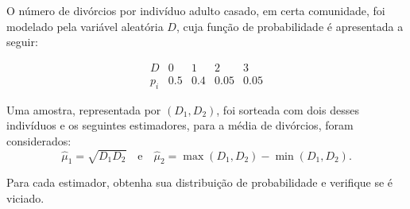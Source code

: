 %
%


\begin{exercicioBanco}[\valorquestao]
    O número de divórcios por indivíduo adulto casado, em certa comunidade, foi modelado pela variável aleatória \(D\), cuja função de probabilidade é apresentada a seguir:

\[
\begin{array}{c|cccc}
D   & 0 & 1 & 2 & 3 \\ \hline
p_i & 0.5 & 0.4 & 0.05 & 0.05
\end{array}
\]

Uma amostra, representada por \((D_1, D_2)\), foi sorteada com dois desses indivíduos e os seguintes estimadores, para a média de divórcios, foram considerados:
\[
\hat{\mu}_1 = \sqrt{D_1D_2}
\quad \text{e} \quad
\hat{\mu}_2 = \max(D_1, D_2) - \min(D_1, D_2).
\]

Para cada estimador, obtenha sua distribuição de probabilidade e verifique se é viciado.
\end{exercicioBanco}


